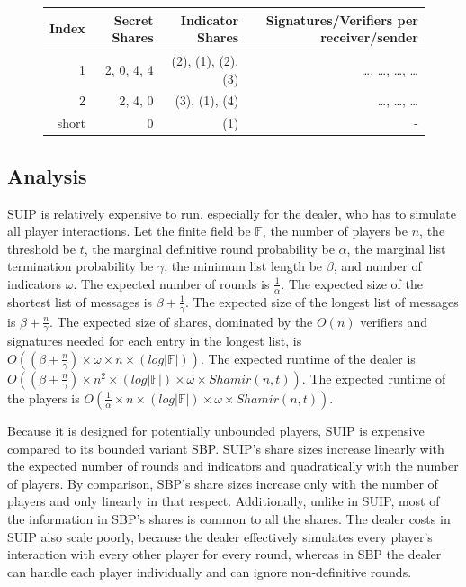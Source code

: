 \documentclass{dalcsthesis}
\begin{document}
\begin{figure}
\begin{itemize}
      \begin{tabular}{|r|r|r|r|}
      \hline
        Index & Secret Shares & Indicator Shares & Signatures/Verifiers per receiver/sender \\
      \hline
        1 & 2, 0, 4, 4 & (2), (1), (2), (3) & \ldots, \ldots, \ldots, \ldots\\
      \hline
        2 & 2, 4, 0 & (3), (1), (4) & \ldots, \ldots, \ldots\\
      \hline
        short & 0 & (1) & -\\
      \hline
      \end{tabular}
  \end{itemize}
\end{figure}

\subsection{Analysis}

SUIP is relatively expensive to run, especially for the dealer, who has to simulate all player interactions. Let the finite field be $\mathbb{F}$, the number of players be $n$, the threshold be $t$, the marginal definitive round probability be $\alpha$, the marginal list termination probability be $\gamma$, the minimum list length be $\beta$, and number of indicators $\omega$. The expected number of rounds is $\frac{1}{\alpha}$. The expected size of the shortest list of messages is $\beta + \frac{1}{\gamma}$. The expected size of the longest list of messages is $\beta + \frac{n}{\gamma}$. The expected size of shares, dominated by the $O(n)$ verifiers and signatures needed for each entry in the longest list, is $O((\beta + \frac{n}{\gamma}) \times \omega \times n \times (log |\mathbb{F}|))$. The expected runtime of the dealer is $O((\beta + \frac{n}{\gamma}) \times n^2 \times (log |\mathbb{F}|) \times \omega \times Shamir(n, t))$. The expected runtime of the players is $O(\frac{1}{\alpha} \times n \times (log |\mathbb{F}|) \times \omega \times Shamir(n, t))$.

Because it is designed for potentially unbounded players, SUIP is expensive compared to its bounded variant SBP. SUIP's share sizes increase linearly with the expected number of rounds and indicators and quadratically with the number of players. By comparison, SBP's share sizes increase only with the number of players and only linearly in that respect. Additionally, unlike in SUIP, most of the information in SBP's shares is common to all the shares. The dealer costs in SUIP also scale poorly, because the dealer effectively simulates every player's interaction with every other player for every round, whereas in SBP the dealer can handle each player individually and can ignore non-definitive rounds.
\end{document}
